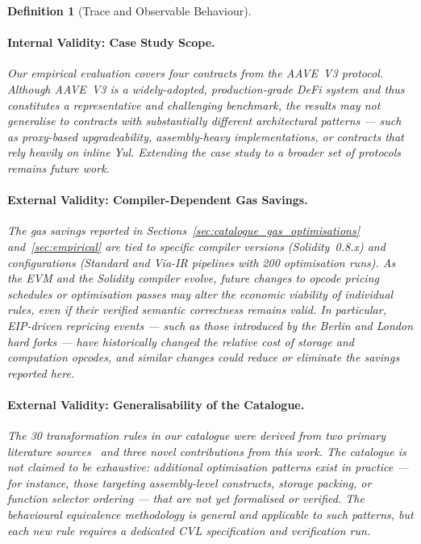 \documentclass[manuscript,screen,review]{acmart}
\newtheorem{definition}{Definition}
\begin{document}
\begin{definition}[Trace and Observable Behaviour]
\paragraph{Internal Validity: Case Study Scope.}
Our empirical evaluation covers four contracts from the AAVE~V3
protocol. Although AAVE~V3 is a widely-adopted, production-grade
DeFi system and thus constitutes a representative and challenging
benchmark, the results may not generalise to contracts with
substantially different architectural patterns --- such as
proxy-based upgradeability, assembly-heavy implementations, or
contracts that rely heavily on inline Yul. Extending the case study
to a broader set of protocols remains future work.

\paragraph{External Validity: Compiler-Dependent Gas Savings.}
The gas savings reported in Sections~\ref{sec:catalogue_gas_optimisations}
and~\ref{sec:empirical} are tied to specific compiler versions
(Solidity~0.8.x) and configurations (Standard and Via-IR pipelines
with 200 optimisation runs). As the EVM and the Solidity compiler
evolve, future changes to opcode pricing schedules or optimisation
passes may alter the \emph{economic} viability of individual rules,
even if their verified \emph{semantic} correctness remains valid.
In particular, EIP-driven repricing events --- such as those
introduced by the Berlin and London hard forks --- have historically
changed the relative cost of storage and computation opcodes, and
similar changes could reduce or eliminate the savings reported here.

\paragraph{External Validity: Generalisability of the Catalogue.}
The 30 transformation rules in our catalogue were derived from two
primary literature sources~\cite{khanzadeh2023optimizing,Nelaturu2021}
and three novel contributions from this work. The catalogue is not
claimed to be exhaustive: additional optimisation patterns exist in
practice --- for instance, those targeting assembly-level
constructs, storage packing, or function selector ordering --- that
are not yet formalised or verified. The behavioural equivalence
methodology is general and applicable to such patterns, but each
new rule requires a dedicated CVL specification and verification run.

\end{definition}
\end{document}
